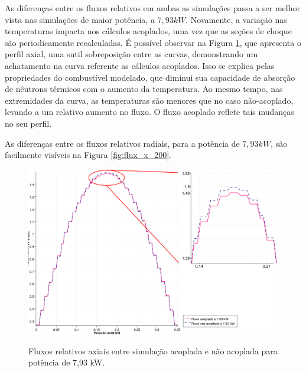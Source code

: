 As diferenças entre os fluxos relativos em ambas as simulações passa a ser melhor
vista nas simulações de maior potência, a $7,93 kW$. Novamente, a variação nas temperaturas
impacta nos cálculos acoplados, uma vez que as seções de choque são periodicamente
recalculadas. É possível observar na Figura \ref{fig:flux_z_200}, que apresenta o perfil axial,
uma sutil sobreposição entre as curvas, demonstrando um achatamento na curva
referente as cálculos acoplados. Isso se explica pelas propriedades do combustível modelado,
que diminui sua capacidade de absorção de nêutrons térmicos com o aumento da temperatura.
Ao mesmo tempo, nas extremidades da curva, as temperaturas são menores que no caso não-acoplado,
levando a um relativo aumento no fluxo. O fluxo acoplado reflete tais mudanças no seu perfil.

As diferenças entre os fluxos relativos radiais, para a potência de $7,93 kW$, são facilmente
visíveis na Figura \ref{fig:flux_x_200}.

\begin{figure}[htb]
  \caption{Fluxos relativos axiais entre simulação acoplada e não acoplada para
    potência de 7,93 kW.}
  \centering\includegraphics[scale=0.5]{figuras/Flux_rel_z_200_port_trabalhado.png}
  \label{fig:flux_z_200}
\end{figure}

